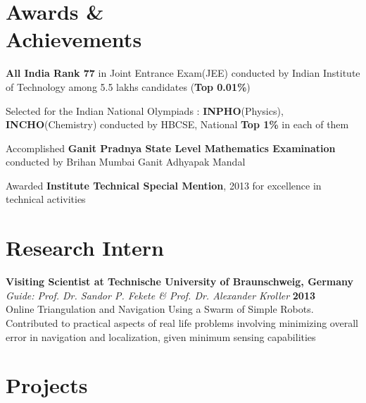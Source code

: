 \documentclass[margin,11pt]{resume}
\begin{document}
\begin{resume}

\vspace{30mm}

\section{\mysidestyle Awards \&\\ Achievements}

\begin{list2}
\item \textbf {All India Rank 77} in Joint Entrance Exam(JEE) conducted by Indian Institute of Technology among 5.5 lakhs candidates (\textbf{Top 0.01\%})
\item Selected for the Indian National Olympiads : \textbf{INPHO}(Physics), \textbf{INCHO}(Chemistry) conducted by HBCSE,  National \textbf{Top 1\%} in each of them
\item Accomplished \textbf {Ganit Pradnya State Level Mathematics Examination} conducted by Brihan Mumbai Ganit Adhyapak Mandal
\item Awarded \textbf {Institute Technical Special Mention}, 2013 for excellence in technical activities 
				
\vspace{-3mm}
\end{list2}\vspace{0.25mm}

\section{\mysidestyle Research Intern}
				\textbf{Visiting Scientist at  Technische University of Braunschweig, Germany\\} 				\emph{Guide: Prof. Dr. Sandor P. Fekete \& Prof. Dr. Alexander Kroller} \hfill {\textbf{2013}}\\
				Online Triangulation and Navigation Using a Swarm of Simple Robots. Contributed to practical aspects of real life problems involving minimizing overall error in navigation and localization, given minimum sensing capabilities

\vspace{-3mm}
\section{\mysidestyle Projects}


\end{resume}
\end{document}
